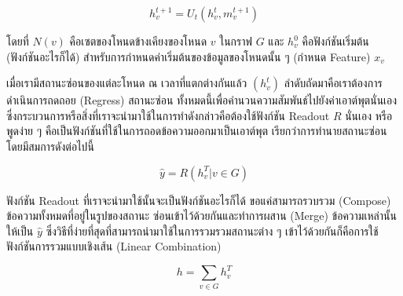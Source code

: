 \begin{equation}\label{hidden_func}
    h^{t+1}_{v} = U_{t}(h^{t}_{v}, m^{t+1}_{v})
\end{equation}

\noindent โดยที่ $N(v)$ คือเซตของโหนดข้างเคียงของโหนด $v$ ในกราฟ $G$ และ $h^{0}_{v}$ คือฟังก์ชันเริ่มต้น (ฟังก์ชันอะไรก็ได้) 
สำหรับการกำหนดค่าเริ่มต้นของข้อมูลของโหนดนั้น ๆ (กำหนด Feature) $x_{v}$

\begin{center}
\end{center}

เมื่อเรามีสถานะซ่อนของแต่ละโหนด ณ เวลาที่แตกต่างกันแล้ว $(h^{t}_{v})$ ลำดับถัดมาคือเราต้องการดำเนินการถดถอย (Regress) สถานะซ่อน%
ทั้งหมดนี้เพื่อคำนวนความสัมพันธ์ไปยังค่าเอาต์พุตนั่นเอง ซึ่งกระบวนการหรือสิ่งที่เราจะนำมาใช้ในการทำดังกล่าวคือต้องใช้ฟังก์ชัน Readout $R$ นั่นเอง
หรือพูดง่าย ๆ คือเป็นฟังก์ชันที่ใช้ในการถอดข้อความออกมาเป็นเอาต์พุต เรียกว่าการทำนายสถานะซ่อน โดยมีสมการดังต่อไปนี้

\begin{equation}
    \hat{y} = R({h^{T}_{v} | v \in G})
\end{equation}

\noindent ฟังก์ชัน Readout ที่เราจะนำมาใช้นั้นจะเป็นฟังก์ชันอะไรก็ได้ ขอแค่สามารถรวบรวม (Compose) ข้อความทั้งหมดที่อยู่ในรูปของสถานะ%
ซ่อนเข้าไว้ด้วยกันและทำการผสาน (Merge) ข้อความเหล่านั้นให้เป็น $\hat{y}$ ซึ่งวิธีที่ง่ายที่สุดที่สามารถนำมาใช้ในการรวมรวมสถานะต่าง ๆ 
เข้าไว้ด้วยกันก็คือการใช้ฟังก์ชันการรวมแบบเชิงเส้น (Linear Combination)

\begin{equation}
    h = \sum_{v \in G} h^{T}_{v}
\end{equation}

